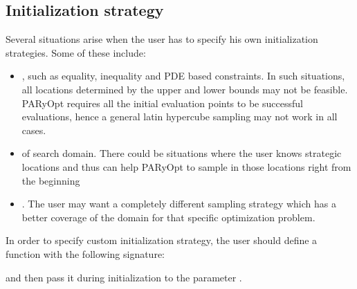 \documentclass[letterpaper,12pt,english]{sphinxmanual}
\begin{document}
\subsection{Initialization strategy}
\label{\detokenize{examples/user_defined_function_example:initialization-strategy}}\label{\detokenize{examples/user_defined_function_example:ex1-init}}
\sphinxAtStartPar
Several situations arise when the user has to specify his own initialization strategies. Some of these include:
\begin{itemize}
\item {} 
\sphinxAtStartPar
{}, such as equality, inequality and PDE based constraints. In such situations, all locations determined
by the upper and lower bounds may not be feasible. PARyOpt requires all the initial evaluation points to be successful
evaluations, hence a general latin hypercube sampling may not work in all cases.

\item {} 
\sphinxAtStartPar
{} of search domain. There could be situations where the user knows strategic locations and thus can
help PARyOpt to sample in those locations right from the beginning

\item {} 
\sphinxAtStartPar
{}. The user may want a completely different sampling strategy which has a better
coverage of the domain for that specific optimization problem.

\end{itemize}

\sphinxAtStartPar
In order to specify custom initialization strategy, the user should define a function with the following signature:

\begin{sphinxVerbatim}[commandchars=\\\{\}]
          \PYG{p}{[}\PYG{p}{]}
\end{sphinxVerbatim}

\sphinxAtStartPar
and then pass it during initialization to the parameter .
\end{document}
